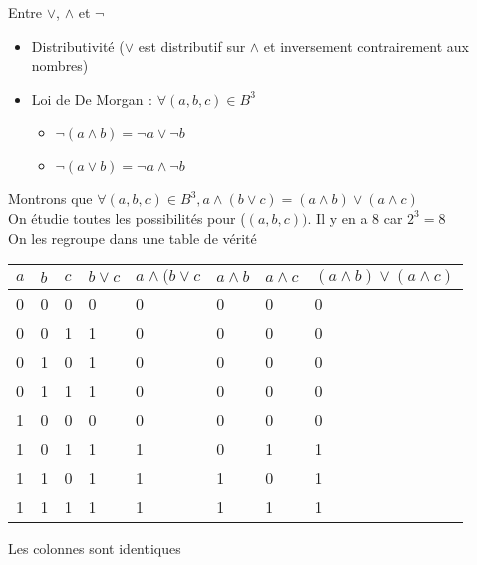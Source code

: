 \begin{prop}
    Entre $\lor$, $\land$ et $\lnot$
    \begin{itemize}
        \item Distributivité ($\lor$ est distributif sur $\land$ et inversement contrairement aux nombres)
        \item Loi de De Morgan : $\forall (a,b,c) \in B^3$
            \begin{itemize}
                \item $\lnot(a\land b)= \lnot a \lor \lnot b$
                \item $\lnot(a\lor b)= \lnot a \land \lnot b$
            \end{itemize}
    \end{itemize}
\end{prop}

\begin{dem}
    Montrons que $\forall (a,b,c) \in B^3, a\land(b\lor c)=(a\land b)\lor (a \land c)$ \\
    On étudie toutes les possibilités pour ($(a,b,c))$. Il y en a $8$ car $2^3=8$ \\
    On les regroupe dans une table de vérité \\

        \begin{tabular}{|l|l|l|l|l|l|l|l|}
        \hline
        $a$ & $b$ & $c$ & $b\lor c$ & $a\land (b\lor c$ & $a\land b$ & $a \land c$ & $(a\land b)\lor (a\land c)$ \\ \hline
        0   & 0   & 0   & 0         & 0                 & 0          & 0           & 0                           \\ \hline
        0   & 0   & 1   & 1         & 0                 & 0          & 0           & 0                           \\ \hline
        0   & 1   & 0   & 1         & 0                 & 0          & 0           & 0                           \\ \hline
        0   & 1   & 1   & 1         & 0                 & 0          & 0           & 0                           \\ \hline
        1   & 0   & 0   & 0         & 0                 & 0          & 0           & 0                           \\ \hline
        1   & 0   & 1   & 1         & 1                 & 0          & 1           & 1                           \\ \hline
        1   & 1   & 0   & 1         & 1                 & 1          & 0           & 1                           \\ \hline
        1   & 1   & 1   & 1         & 1                 & 1          & 1           & 1                            \\ \hline
        \end{tabular}


    Les colonnes sont identiques \\
\end{dem}

